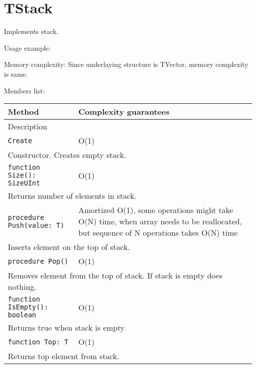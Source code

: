 \chapter{TStack}

Implements stack.

Usage example:



Memory complexity:
Since underlaying structure is TVector, memory complexity is same.

Members list:

\begin{longtable}{|m{10cm}|m{5cm}|}
\hline
Method & Complexity guarantees \\ \hline
\multicolumn{2}{|m{15cm}|}{Description} \\ \hline\hline

\verb!Create! & O(1) \\ \hline
\multicolumn{2}{|m{15cm}|}{Constructor. Creates empty stack.} \\ \hline\hline

\verb!function Size(): SizeUInt! & O(1) \\ \hline
\multicolumn{2}{|m{15cm}|}{Returns number of elements in stack.} \\\hline\hline

\verb!procedure Push(value: T)! &  Amortized
O(1), some operations might take O(N) time, when array needs to be reallocated, but sequence of N
operations takes O(N) time \\ \hline
\multicolumn{2}{|m{15cm}|}{Inserts element on the top of stack.} \\\hline\hline

\verb!procedure Pop()! & O(1) \\\hline
\multicolumn{2}{|m{15cm}|}{Removes element from the top of stack. If stack is empty does nothing.} \\\hline\hline

\verb!function IsEmpty(): boolean! & O(1) \\ \hline
\multicolumn{2}{|m{15cm}|}{Returns true when stack is empty} \\\hline\hline

\verb!function Top: T! & O(1) \\\hline
\multicolumn{2}{|m{15cm}|}{Returns top element from stack.} \\\hline

\end{longtable}
